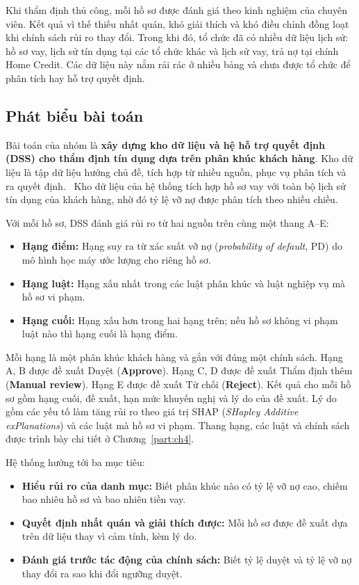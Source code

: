 Khi thẩm định thủ công, mỗi hồ sơ được đánh giá theo kinh nghiệm của chuyên viên. Kết quả vì thế thiếu nhất quán, khó giải thích và khó điều chỉnh đồng loạt khi chính sách rủi ro thay đổi. Trong khi đó, tổ chức đã có nhiều dữ liệu lịch sử: hồ sơ vay, lịch sử tín dụng tại các tổ chức khác và lịch sử vay, trả nợ tại chính Home Credit. Các dữ liệu này nằm rải rác ở nhiều bảng và chưa được tổ chức để phân tích hay hỗ trợ quyết định.

\subsection{Phát biểu bài toán}
\label{sec:problem}
Bài toán của nhóm là \textbf{xây dựng kho dữ liệu và hệ hỗ trợ quyết định (DSS) cho thẩm định tín dụng dựa trên phân khúc khách hàng}. Kho dữ liệu là tập dữ liệu hướng chủ đề, tích hợp từ nhiều nguồn, phục vụ phân tích và ra quyết định.~\cite{inmon2005} Kho dữ liệu của hệ thống tích hợp hồ sơ vay với toàn bộ lịch sử tín dụng của khách hàng, nhờ đó tỷ lệ vỡ nợ được phân tích theo nhiều chiều.

\medskip

Với mỗi hồ sơ, DSS đánh giá rủi ro từ hai nguồn trên cùng một thang A--E:
\begin{itemize}[itemsep=1pt]
	\item \textbf{Hạng điểm:} Hạng suy ra từ xác suất vỡ nợ (\textit{probability of default}, PD) do mô hình học máy ước lượng cho riêng hồ sơ.
	\item \textbf{Hạng luật:} Hạng xấu nhất trong các luật phân khúc và luật nghiệp vụ mà hồ sơ vi phạm.
	\item \textbf{Hạng cuối:} Hạng xấu hơn trong hai hạng trên; nếu hồ sơ không vi phạm luật nào thì hạng cuối là hạng điểm.
\end{itemize}

Mỗi hạng là một phân khúc khách hàng và gắn với đúng một chính sách. Hạng A, B được đề xuất Duyệt (\textbf{Approve}). Hạng C, D được đề xuất Thẩm định thêm (\textbf{Manual review}). Hạng E được đề xuất Từ chối (\textbf{Reject}). Kết quả cho mỗi hồ sơ gồm hạng cuối, đề xuất, hạn mức khuyến nghị và lý do của đề xuất. Lý do gồm các yếu tố làm tăng rủi ro theo giá trị SHAP (\textit{SHapley Additive exPlanations}) và các luật mà hồ sơ vi phạm. Thang hạng, các luật và chính sách được trình bày chi tiết ở Chương~\ref{part:ch4}.

\medskip

Hệ thống hướng tới ba mục tiêu:
\begin{itemize}[topsep=0pt, itemsep=1pt]
	\item \textbf{Hiểu rủi ro của danh mục:} Biết phân khúc nào có tỷ lệ vỡ nợ cao, chiếm bao nhiêu hồ sơ và bao nhiêu tiền vay.
	\item \textbf{Quyết định nhất quán và giải thích được:} Mỗi hồ sơ được đề xuất dựa trên dữ liệu thay vì cảm tính, kèm lý do.
	\item \textbf{Đánh giá trước tác động của chính sách:} Biết tỷ lệ duyệt và tỷ lệ vỡ nợ thay đổi ra sao khi đổi ngưỡng duyệt.
\end{itemize}

